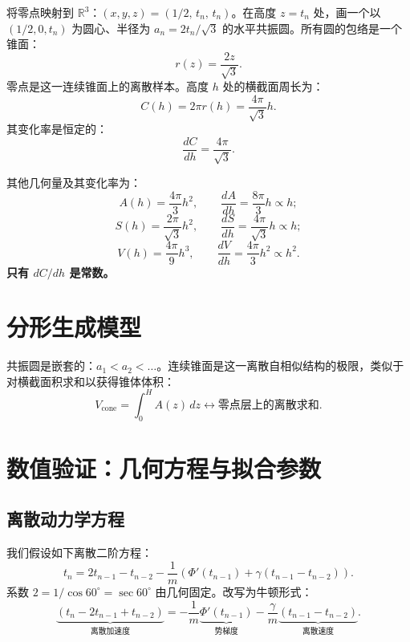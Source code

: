 \documentclass[12pt,a4paper]{article}
\begin{document}
将零点映射到 $\mathbb{R}^3$：$(x,y,z) = (1/2,\, t_n,\, t_n)$。在高度 $z=t_n$ 处，画一个以 $(1/2, 0, t_n)$ 为圆心、半径为 $a_n = 2t_n/\sqrt{3}$ 的水平共振圆。所有圆的包络是一个锥面：
\begin{equation}
r(z) = \frac{2z}{\sqrt{3}}.
\end{equation}
零点是这一连续锥面上的离散样本。高度 $h$ 处的横截面周长为：
\begin{equation}
C(h) = 2\pi r(h) = \frac{4\pi}{\sqrt{3}}h.
\end{equation}
其变化率是恒定的：
\begin{equation}
\frac{dC}{dh} = \frac{4\pi}{\sqrt{3}}.
\end{equation}

其他几何量及其变化率为：
\begin{equation}
A(h) = \frac{4\pi}{3}h^2, \qquad \frac{dA}{dh} = \frac{8\pi}{3}h \propto h;
\end{equation}
\begin{equation}
S(h) = \frac{2\pi}{\sqrt{3}}h^2, \qquad \frac{dS}{dh} = \frac{4\pi}{\sqrt{3}}h \propto h;
\end{equation}
\begin{equation}
V(h) = \frac{4\pi}{9}h^3, \qquad \frac{dV}{dh} = \frac{4\pi}{3}h^2 \propto h^2.
\end{equation}
\textbf{只有 $dC/dh$ 是常数。}

\section{分形生成模型}

共振圆是嵌套的：$a_1 < a_2 < \dots$。连续锥面是这一离散自相似结构的极限，类似于对横截面积求和以获得锥体体积：
\begin{equation}
V_{\text{cone}} = \int_0^H A(z)\,dz \longleftrightarrow \text{零点层上的离散求和}.
\end{equation}

\section{数值验证：几何方程与拟合参数}

\subsection{离散动力学方程}

我们假设如下离散二阶方程：
\begin{equation}
t_n = 2t_{n-1} - t_{n-2} - \frac{1}{m}\left(\Phi'(t_{n-1}) + \gamma(t_{n-1} - t_{n-2})\right). \label{eq:main}
\end{equation}
系数 $2 = 1/\cos 60^\circ = \sec 60^\circ$ 由几何固定。改写为牛顿形式：
\begin{equation}
\underbrace{(t_n - 2t_{n-1} + t_{n-2})}_{\text{离散加速度}} = -\frac{1}{m}\underbrace{\Phi'(t_{n-1})}_{\text{势梯度}} - \frac{\gamma}{m}\underbrace{(t_{n-1} - t_{n-2})}_{\text{离散速度}}.
\end{equation}
\end{document}
